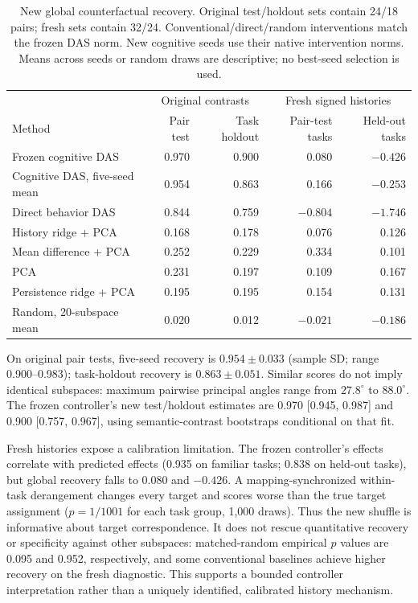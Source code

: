 \documentclass{article}
\begin{document}
\begin{table}[htbp]
\centering\small
\begin{tabular}{lrrrr}
\toprule
 & \multicolumn{2}{c}{Original contrasts} & \multicolumn{2}{c}{Fresh signed histories} \\
Method & Pair test & Task holdout & Pair-test tasks & Held-out tasks \\
\midrule
Frozen cognitive DAS & 0.970 & 0.900 & 0.080 & $-0.426$ \\
Cognitive DAS, five-seed mean & 0.954 & 0.863 & 0.166 & $-0.253$ \\
Direct behavior DAS & 0.844 & 0.759 & $-0.804$ & $-1.746$ \\
History ridge + PCA & 0.168 & 0.178 & 0.076 & 0.126 \\
Mean difference + PCA & 0.252 & 0.229 & 0.334 & 0.101 \\
PCA & 0.231 & 0.197 & 0.109 & 0.167 \\
Persistence ridge + PCA & 0.195 & 0.195 & 0.154 & 0.131 \\
Random, 20-subspace mean & 0.020 & 0.012 & $-0.021$ & $-0.186$ \\
\bottomrule
\end{tabular}
\caption{New global counterfactual recovery. Original test/holdout sets contain 24/18 pairs; fresh sets contain 32/24. Conventional/direct/random interventions match the frozen DAS norm. New cognitive seeds use their native intervention norms. Means across seeds or random draws are descriptive; no best-seed selection is used.}
\label{tab:runpod}
\end{table}

On original pair tests, five-seed recovery is $0.954\pm0.033$ (sample SD; range 0.900--0.983); task-holdout recovery is $0.863\pm0.051$. Similar scores do not imply identical subspaces: maximum pairwise principal angles range from $27.8^\circ$ to $88.0^\circ$. The frozen controller's new test/holdout estimates are 0.970 [0.945, 0.987] and 0.900 [0.757, 0.967], using semantic-contrast bootstraps conditional on that fit.

Fresh histories expose a calibration limitation. The frozen controller's effects correlate with predicted effects (0.935 on familiar tasks; 0.838 on held-out tasks), but global recovery falls to 0.080 and $-0.426$. A mapping-synchronized within-task derangement changes every target and scores worse than the true target assignment ($p=1/1001$ for each task group, 1,000 draws). Thus the new shuffle is informative about target correspondence. It does not rescue quantitative recovery or specificity against other subspaces: matched-random empirical $p$ values are 0.095 and 0.952, respectively, and some conventional baselines achieve higher recovery on the fresh diagnostic. This supports a bounded controller interpretation rather than a uniquely identified, calibrated history mechanism.
\end{document}
